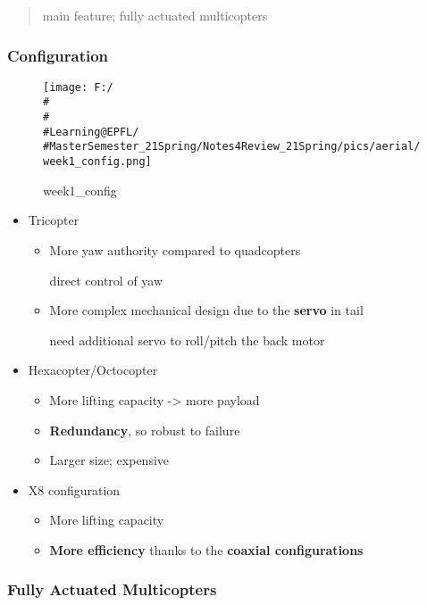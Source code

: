 \documentclass[]{article}
\begin{document}
\begin{quote}
main feature; fully actuated multicopters
\end{quote}

\subsubsection{Configuration}\label{header-n312}

\begin{figure}
\centering
\texttt{[image: F:/\\\#\\\#\\\#Learning@EPFL/\\\#MasterSemester\_21Spring/Notes4Review\_21Spring/pics/aerial/week1\_config.png]}
\caption{week1\_config}
\end{figure}

\begin{itemize}
\item
  Tricopter

  \begin{itemize}
  \item
    More yaw authority compared to quadcopters

    direct control of yaw
  \item
    More complex mechanical design due to the \textbf{servo} in tail

    need additional servo to roll/pitch the back motor
  \end{itemize}
\item
  Hexacopter/Octocopter

  \begin{itemize}
  \item
    More lifting capacity -\textgreater{} more payload
  \item
    \textbf{Redundancy}, so robust to failure
  \item
    Larger size; expensive
  \end{itemize}
\item
  X8 configuration

  \begin{itemize}
  \item
    More lifting capacity
  \item
    \textbf{More efficiency} thanks to the \textbf{coaxial
    configurations}
  \end{itemize}
\end{itemize}

\subsubsection{Fully Actuated Multicopters}\label{header-n340}
\end{document}
